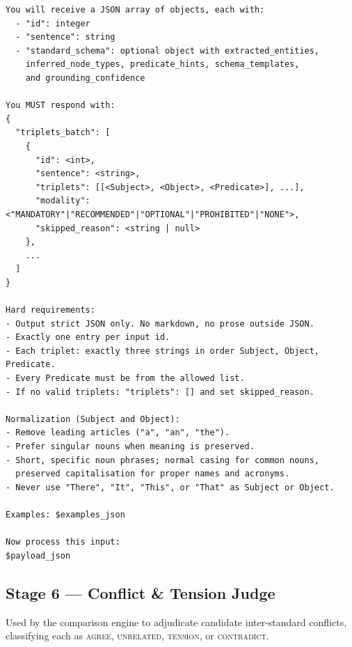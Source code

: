 \begin{lstlisting}[language={},breaklines=true,caption={},numbers=none,xleftmargin=0pt]
You will receive a JSON array of objects, each with:
  - "id": integer
  - "sentence": string
  - "standard_schema": optional object with extracted_entities,
    inferred_node_types, predicate_hints, schema_templates,
    and grounding_confidence

You MUST respond with:
{
  "triplets_batch": [
    {
      "id": <int>,
      "sentence": <string>,
      "triplets": [[<Subject>, <Object>, <Predicate>], ...],
      "modality": <"MANDATORY"|"RECOMMENDED"|"OPTIONAL"|"PROHIBITED"|"NONE">,
      "skipped_reason": <string | null>
    },
    ...
  ]
}

Hard requirements:
- Output strict JSON only. No markdown, no prose outside JSON.
- Exactly one entry per input id.
- Each triplet: exactly three strings in order Subject, Object, Predicate.
- Every Predicate must be from the allowed list.
- If no valid triplets: "triplets": [] and set skipped_reason.

Normalization (Subject and Object):
- Remove leading articles ("a", "an", "the").
- Prefer singular nouns when meaning is preserved.
- Short, specific noun phrases; normal casing for common nouns,
  preserved capitalisation for proper names and acronyms.
- Never use "There", "It", "This", or "That" as Subject or Object.

Examples: $examples_json

Now process this input:
$payload_json
\end{lstlisting}

\subsection{Stage 6 — Conflict \& Tension Judge}
\label{app:prompt-conflict-judge}

Used by the comparison engine to adjudicate candidate inter-standard
conflicts, classifying each as \textsc{agree}, \textsc{unrelated},
\textsc{tension}, or \textsc{contradict}.


